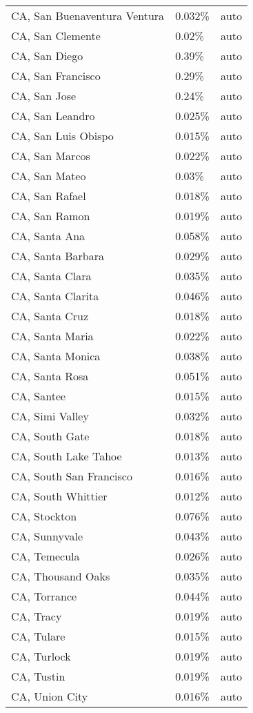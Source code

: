 \begin{longtable}[]{@{}lll@{}}
CA, San Buenaventura Ventura & 0.032\% & auto \\
CA, San Clemente & 0.02\% & auto \\
CA, San Diego & 0.39\% & auto \\
CA, San Francisco & 0.29\% & auto \\
CA, San Jose & 0.24\% & auto \\
CA, San Leandro & 0.025\% & auto \\
CA, San Luis Obispo & 0.015\% & auto \\
CA, San Marcos & 0.022\% & auto \\
CA, San Mateo & 0.03\% & auto \\
CA, San Rafael & 0.018\% & auto \\
CA, San Ramon & 0.019\% & auto \\
CA, Santa Ana & 0.058\% & auto \\
CA, Santa Barbara & 0.029\% & auto \\
CA, Santa Clara & 0.035\% & auto \\
CA, Santa Clarita & 0.046\% & auto \\
CA, Santa Cruz & 0.018\% & auto \\
CA, Santa Maria & 0.022\% & auto \\
CA, Santa Monica & 0.038\% & auto \\
CA, Santa Rosa & 0.051\% & auto \\
CA, Santee & 0.015\% & auto \\
CA, Simi Valley & 0.032\% & auto \\
CA, South Gate & 0.018\% & auto \\
CA, South Lake Tahoe & 0.013\% & auto \\
CA, South San Francisco & 0.016\% & auto \\
CA, South Whittier & 0.012\% & auto \\
CA, Stockton & 0.076\% & auto \\
CA, Sunnyvale & 0.043\% & auto \\
CA, Temecula & 0.026\% & auto \\
CA, Thousand Oaks & 0.035\% & auto \\
CA, Torrance & 0.044\% & auto \\
CA, Tracy & 0.019\% & auto \\
CA, Tulare & 0.015\% & auto \\
CA, Turlock & 0.019\% & auto \\
CA, Tustin & 0.019\% & auto \\
CA, Union City & 0.016\% & auto \\

\end{longtable}
